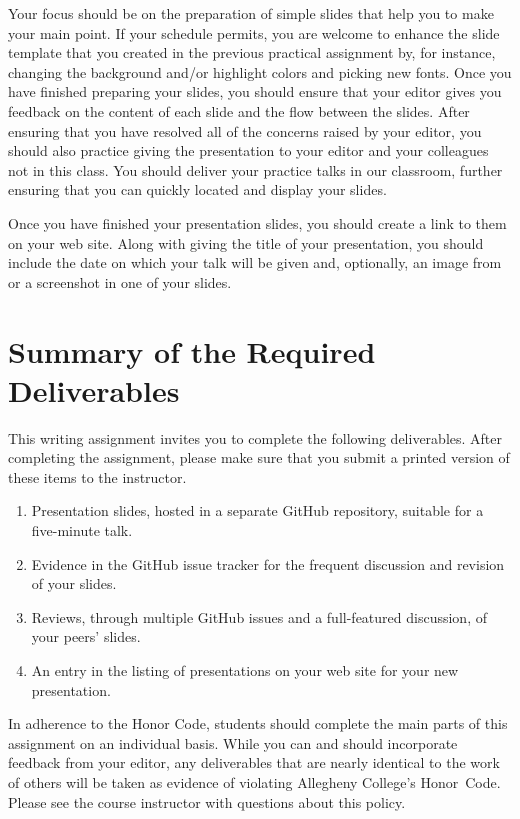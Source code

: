 Your focus should be on the preparation of simple slides that help you to make your main point. If your schedule
permits, you are welcome to enhance the slide template that you created in the previous practical assignment by, for
instance, changing the background and/or highlight colors and picking new fonts. Once you have finished preparing your
slides, you should ensure that your editor gives you feedback on the content of each slide and the flow between the
slides. After ensuring that you have resolved all of the concerns raised by your editor, you should also practice giving
the presentation to your editor and your colleagues not in this class. You should deliver your practice talks in our
classroom, further ensuring that you can quickly located and display your slides.

Once you have finished your presentation slides, you should create a link to them on your web site. Along with giving
the title of your presentation, you should include the date on which your talk will be given and, optionally, an image
from or a screenshot in one of your slides.

\vspace*{-.1in}
\section*{Summary of the Required Deliverables}

This writing assignment invites you to complete the following deliverables. After completing the assignment, please make
sure that you submit a printed version of these items to the instructor.

\vspace*{-.1in}
\begin{enumerate}
  \setlength{\itemsep}{-.01in}

  \item Presentation slides, hosted in a separate GitHub repository, suitable for a five-minute talk.
  \item Evidence in the GitHub issue tracker for the frequent discussion and revision of your slides.
  \item Reviews, through multiple GitHub issues and a full-featured discussion, of your peers' slides.
  \item An entry in the listing of presentations on your web site for your new presentation.

\end{enumerate}
\vspace*{-.1in}

In adherence to the Honor Code, students should complete the main parts of this assignment on an individual basis. While
you can and should incorporate feedback from your editor, any deliverables that are nearly identical to the work of
others will be taken as evidence of violating Allegheny College's \mbox{Honor Code}. Please see the course instructor
with questions about this policy.


